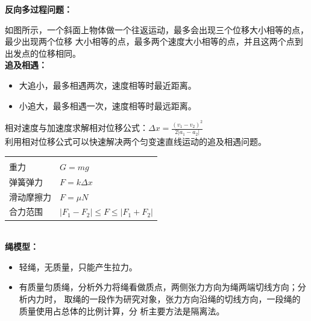 \documentclass[a4paper, landscape, 10pt, twocolumn]{article}
\begin{document}
\textbf{反向多过程问题：}
\begin{center}
\end{center}
如图所示，一个斜面上物体做一个往返运动，最多会出现三个位移大小相等的点，最少出现两个位移
大小相等的点，最多两个速度大小相等的点，并且这两个点到出发点的位移相同。\\
\textbf{追及相遇：}
\begin{itemize}
  \item 大追小，最多相遇两次，速度相等时最近距离。
  \item 小追大，最多相遇一次，速度相等时最远距离。
\end{itemize}
相对速度与加速度求解相对位移公式：$\Delta x=\frac{(v_1-v_2)^2}{2|a_1-a_2|}$\\
利用相对位移公式可以快速解决两个匀变速直线运动的追及相遇问题。
\newpage
\noindent
\begin{tabularx}{\columnwidth}{XX}
  \rowcolor{blue!30}
  \multicolumn{2}{l}{\parbox[c][2.5\ht\strutbox][c]{0.9\columnwidth}{\Large 静力学}} \\
  重力&$G=mg$\\
  弹簧弹力&$F=k\Delta x$\\

  滑动摩擦力&$F=\mu N$\\
  合力范围&$|F_1-F_2|\le F \le |F_1+F_2|$\\
\end{tabularx}
\\
\textbf{绳模型：}
\begin{itemize}
  \item 轻绳，无质量，只能产生拉力。
  \item 有质量匀质绳，分析外力将绳看做质点，两侧张力方向为绳两端切线方向；分析内力时，
    取绳的一段作为研究对象，张力方向沿绳的切线方向，一段绳的质量使用占总体的比例计算，分
    析主要方法是隔离法。
\end{itemize}
\end{document}
